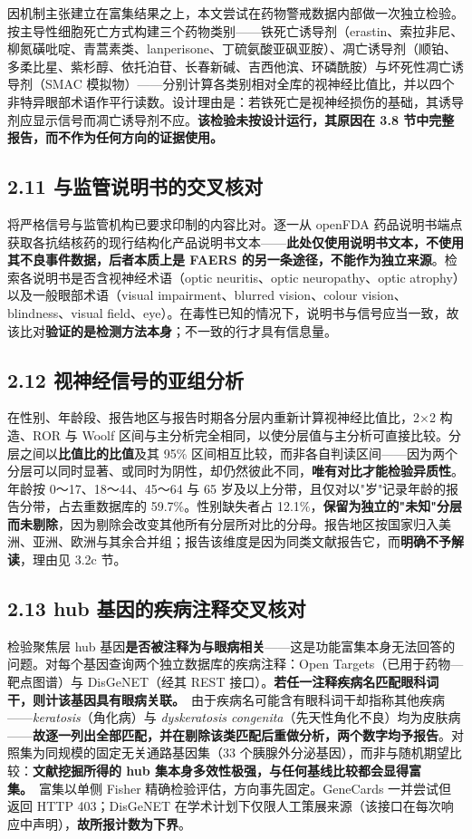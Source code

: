 \documentclass[UTF8,fontset=windows,11pt]{ctexart}
\begin{document}
因机制主张建立在富集结果之上，本文尝试在药物警戒数据内部做一次独立检验。按主导性细胞死亡方式构建三个药物类别——铁死亡诱导剂（erastin、索拉非尼、柳氮磺吡啶、青蒿素类、lanperisone、丁硫氨酸亚砜亚胺）、凋亡诱导剂（顺铂、多柔比星、紫杉醇、依托泊苷、长春新碱、吉西他滨、环磷酰胺）与坏死性凋亡诱导剂（SMAC 模拟物）——分别计算各类别相对全库的视神经比值比，并以四个非特异眼部术语作平行读数。设计理由是：若铁死亡是视神经损伤的基础，其诱导剂应显示信号而凋亡诱导剂不应。\textbf{该检验未按设计运行，其原因在 3.8 节中完整报告，而不作为任何方向的证据使用。}

\subsection{2.11 与监管说明书的交叉核对}

将严格信号与监管机构已要求印制的内容比对。逐一从 openFDA 药品说明书端点获取各抗结核药的现行结构化产品说明书文本——\textbf{此处仅使用说明书文本，不使用其不良事件数据，后者本质上是 FAERS 的另一条途径，不能作为独立来源}。检索各说明书是否含视神经术语（optic neuritis、optic neuropathy、optic atrophy）以及一般眼部术语（visual impairment、blurred vision、colour vision、blindness、visual field、eye）。在毒性已知的情况下，说明书与信号应当一致，故该比对\textbf{验证的是检测方法本身}；不一致的行才具有信息量。

\subsection{2.12 视神经信号的亚组分析}

在性别、年龄段、报告地区与报告时期各分层内重新计算视神经比值比，2×2 构造、ROR 与 Woolf 区间与主分析完全相同，以使分层值与主分析可直接比较。分层之间以\textbf{比值比的比值}及其 95\% 区间相互比较，而非各自判读区间——因为两个分层可以同时显著、或同时为阴性，却仍然彼此不同，\textbf{唯有对比才能检验异质性}。年龄按 0～17、18～44、45～64 与 65 岁及以上分带，且仅对以"岁"记录年龄的报告分带，占去重数据库的 59.7\%。性别缺失者占 12.1\%，\textbf{保留为独立的"未知"分层而未剔除}，因为剔除会改变其他所有分层所对比的分母。报告地区按国家归入美洲、亚洲、欧洲与其余合并组；报告该维度是因为同类文献报告它，而\textbf{明确不予解读}，理由见 3.2c 节。

\subsection{2.13 hub 基因的疾病注释交叉核对}

检验聚焦层 hub 基因\textbf{是否被注释为与眼病相关}——这是功能富集本身无法回答的问题。对每个基因查询两个独立数据库的疾病注释：Open Targets（已用于药物—靶点图谱）与 DisGeNET（经其 REST 接口）。\textbf{若任一注释疾病名匹配眼科词干，则计该基因具有眼病关联。}\ 由于疾病名可能含有眼科词干却指称其他疾病——\textit{keratosis}（角化病）与 \textit{dyskeratosis congenita}（先天性角化不良）均为皮肤病——\textbf{故逐一列出全部匹配，并在剔除该类匹配后重做分析，两个数字均予报告}。对照集为同规模的固定无关通路基因集（33 个胰腺外分泌基因），而非与随机期望比较：\textbf{文献挖掘所得的 hub 集本身多效性极强，与任何基线比较都会显得富集。}\ 富集以单侧 Fisher 精确检验评估，方向事先固定。GeneCards 一并尝试但返回 HTTP 403；DisGeNET 在学术计划下仅限人工策展来源（该接口在每次响应中声明），\textbf{故所报计数为下界}。
\end{document}
